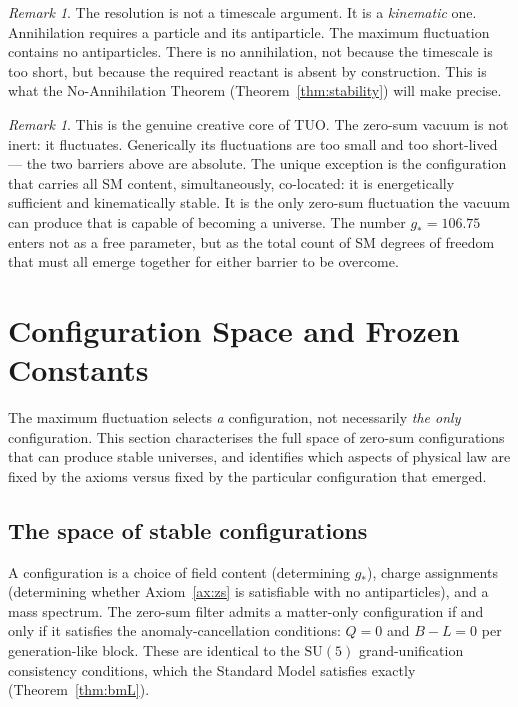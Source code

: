 \documentclass[12pt,a4paper]{article}
\theoremstyle{definition}
\theoremstyle{remark}
\newtheorem{remark}[theorem]{Remark}
\newcommand{\gstar}{g_{*}}
\begin{document}
\begin{remark}
The resolution is not a timescale argument. It is a \emph{kinematic} one.
Annihilation requires a particle and its antiparticle. The maximum
fluctuation contains no antiparticles. There is no annihilation, not
because the timescale is too short, but because the required reactant is
absent by construction. This is what the No-Annihilation Theorem
(Theorem~\ref{thm:stability}) will make precise.
\end{remark}

\begin{remark}
This is the genuine creative core of TUO.
The zero-sum vacuum is not inert: it fluctuates.
Generically its fluctuations are too small and too short-lived --- the two
barriers above are absolute.
The unique exception is the configuration that carries all SM content,
simultaneously, co-located: it is energetically sufficient and kinematically
stable.
It is the only zero-sum fluctuation the vacuum can produce that is capable
of becoming a universe.
The number $\gstar = 106.75$ enters not as a free parameter, but as the
total count of SM degrees of freedom that must all emerge together for
either barrier to be overcome.
\end{remark}

\section{Configuration Space and Frozen Constants}
\label{sec:configs}

The maximum fluctuation selects \emph{a} configuration, not necessarily
\emph{the only} configuration. This section characterises the full space
of zero-sum configurations that can produce stable universes, and identifies
which aspects of physical law are fixed by the axioms versus fixed by the
particular configuration that emerged.

\subsection{The space of stable configurations}

A configuration is a choice of field content (determining $\gstar$),
charge assignments (determining whether Axiom~\ref{ax:zs} is satisfiable
with no antiparticles), and a mass spectrum.
The zero-sum filter admits a matter-only configuration if and only if
it satisfies the anomaly-cancellation conditions: $Q = 0$ and $B - L = 0$
per generation-like block.
These are identical to the $\mathrm{SU}(5)$ grand-unification consistency
conditions, which the Standard Model satisfies exactly
(Theorem~\ref{thm:bmL}).
\end{document}
